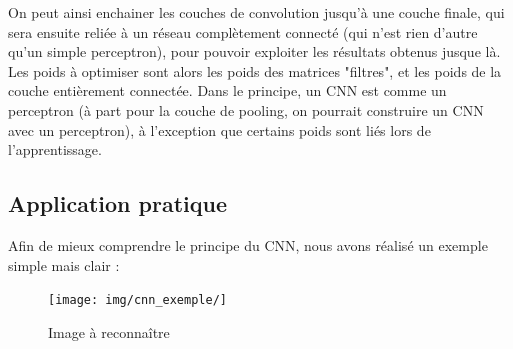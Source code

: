 On peut ainsi enchainer les couches de convolution jusqu'à une couche finale, qui sera ensuite reliée à un réseau complètement connecté (qui n'est rien d'autre qu'un simple perceptron), pour pouvoir exploiter les résultats obtenus jusque là.
Les poids à optimiser sont alors les poids des matrices "filtres", et les poids de la couche entièrement connectée.
Dans le principe, un CNN est comme un perceptron (à part pour la couche de pooling, on pourrait construire un CNN avec un perceptron), à l'exception que certains poids sont liés lors de l'apprentissage. 

\subsection{Application pratique}

Afin de mieux comprendre le principe du CNN, nous avons réalisé un exemple simple mais clair : 
\begin{figure}[h]
 \centering
 \texttt{[image: img/cnn\_exemple/]}
 \caption{Image à reconnaître}
\end{figure}